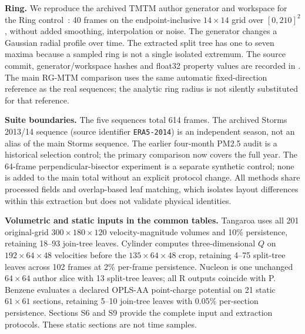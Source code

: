 \textbf{Ring.} We reproduce the archived TMTM author generator and workspace for the Ring control~\cite{Koepp:2023:TMTM,Franke:2021:1DP}: 40 frames on the endpoint-inclusive $14\times14$ grid over $[0,210]^2$, without added smoothing, interpolation or noise. The generator changes a Gaussian radial profile over time. The extracted split tree has one to seven maxima because a sampled ring is not a single isolated extremum. The source commit, generator/workspace hashes and float32 property values are recorded in . The main RG-MTM comparison uses the same automatic fixed-direction reference as the real sequences; the analytic ring radius is not silently substituted for that reference.

\textbf{Suite boundaries.} The five sequences total 614 frames. The archived Storms 2013/14 sequence (source identifier \texttt{ERA5-2014}) is an independent season, not an alias of the main Storms sequence. The earlier four-month PM2.5 audit is a historical selection control; the primary comparison now covers the full year. The 64-frame perpendicular-bisector experiment is a separate synthetic control; none is added to the main total without an explicit protocol change. All methods share processed fields and overlap-based leaf matching, which isolates layout differences within this extraction but does not validate physical identities.

\textbf{Volumetric and static inputs in the common tables.} Tangaroa uses all 201 original-grid $300\times180\times120$ velocity-magnitude volumes and 10\% persistence, retaining 18--93 join-tree leaves. Cylinder computes three-dimensional $Q$ on $192\times64\times48$ velocities before the $135\times64\times48$ crop, retaining 4--75 split-tree leaves across 102 frames at 2\% per-frame persistence. Nucleon is one unchanged $64\times64$ author slice with 13 split-tree leaves; all R outputs coincide with P. Benzene evaluates a declared OPLS-AA point-charge potential on 21 static $61\times61$ sections, retaining 5--10 join-tree leaves with 0.05\% per-section persistence. Sections S6 and S9 provide the complete input and extraction protocols. These static sections are not time samples.

